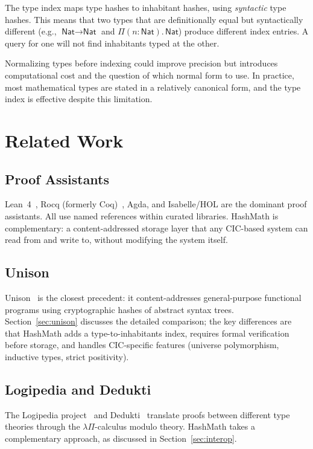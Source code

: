 \documentclass[11pt]{article}
\theoremstyle{definition}
\theoremstyle{plain}
\theoremstyle{remark}
\newcommand{\Nat}{\textsf{Nat}}
\begin{document}
The type index maps type hashes to inhabitant hashes, using \emph{syntactic} type hashes.
This means that two types that are definitionally equal but syntactically different
(e.g., $\Nat \to \Nat$ and $\Pi(n{:}\Nat).\,\Nat$) produce different index entries.
A query for one will not find inhabitants typed at the other.

Normalizing types before indexing could improve precision but introduces computational cost
and the question of which normal form to use.
In practice, most mathematical types are stated in a relatively canonical form, and
the type index is effective despite this limitation.


\section{Related Work}
\label{sec:related}

\subsection{Proof Assistants}

Lean~4~\cite{lean4}, Rocq (formerly Coq)~\cite{coquand1988}, Agda, and Isabelle/HOL
are the dominant proof assistants.
All use named references within curated libraries.
HashMath is complementary: a content-addressed storage layer that any CIC-based system can
read from and write to, without modifying the system itself.

\subsection{Unison}

Unison~\cite{unison} is the closest precedent: it content-addresses general-purpose functional
programs using cryptographic hashes of abstract syntax trees.
Section~\ref{sec:unison} discusses the detailed comparison; the key differences are that
HashMath adds a type-to-inhabitants index, requires formal verification before storage,
and handles CIC-specific features (universe polymorphism, inductive types, strict positivity).

\subsection{Logipedia and Dedukti}

The Logipedia project~\cite{logipedia} and Dedukti~\cite{dedukti} translate proofs between
different type theories through the $\lambda\Pi$-calculus modulo theory.
HashMath takes a complementary approach, as discussed in Section~\ref{sec:interop}.
\end{document}
